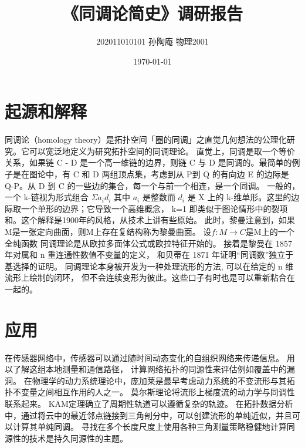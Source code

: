 \documentclass[12pt, a4paper, oneside]{ctexart}
\title{《同调论简史》调研报告}
\date{\today}
\author{202011010101 孙陶庵 物理2001}
\begin{document}
\begin{spacing}{2.0}
\maketitle
\section{起源和解释}
同调论（homology theory）是拓扑空间「圈的同调」之直觉几何想法的公理化研究。它可以宽泛地定义为研究拓扑空间的同调理论。
直觉上，同调是取一个等价关系，如果链 C - D 是一个高一维链的边界，则链 C 与 D 是同调的。最简单的例子是在图论中，有 C 和 D 两组顶点集，考虑到从 P到 Q 的有向边 E 的边际是 Q-P。从 D 到 C 的一些边的集合，每一个与前一个相连，是一个同调。
一般的，一个 k-链视为形式组合
$\Sigma a_i d_i$
其中 $a_i$ 是整数而 $d_{i}$ 是 X 上的 k-维单形。这里的边际取一个单形的边界；它导致一个高维概念，
k=1 即类似于图论情形中的裂项和。这个解释是1900年的风格，从技术上讲有些原始。
此时，黎曼注意到，如果M是一张定向曲面，则M上存在复结构称为黎曼曲面。
设$f:M\rightarrow C $是M上的一个全纯函数\cite{key}
同调理论是从欧拉多面体公式或欧拉特征开始的。
接着是黎曼在 1857 年对属和 n 重连通性数值不变量的定义，
和贝蒂在 1871 年证明“同调数”独立于基选择的证明。
同调理论本身被开发为一种处理流形的方法,
可以在给定的 n 维流形上绘制的闭环，
但不会连续变形为彼此。这些口子有时也是可以重新粘合在一起的。
\section{应用}
在传感器网络中，传感器可以通过随时间动态变化的自组织网络来传递信息。
用以了解这组本地测量和通信路径，
计算网络拓扑的同源性来评估例如覆盖中的漏洞。
在物理学的动力系统理论中，庞加莱是最早考虑动力系统的不变流形与其拓扑不变量之间相互作用的人之一。
莫尔斯理论将流形上梯度流的动力学与同调性联系起来。
KAM定理确立了周期性轨道可以遵循复杂的轨迹。
在拓扑数据分析中，通过将云中的最近邻点链接到三角剖分中，可以创建流形的单纯近似，并且可以计算其单纯同调。
寻找在多个长度尺度上使用各种三角测量策略稳健地计算同源性的技术是持久同源性的主题。\cite{enwiki:1085794346}
\end{spacing}


\end{document}
